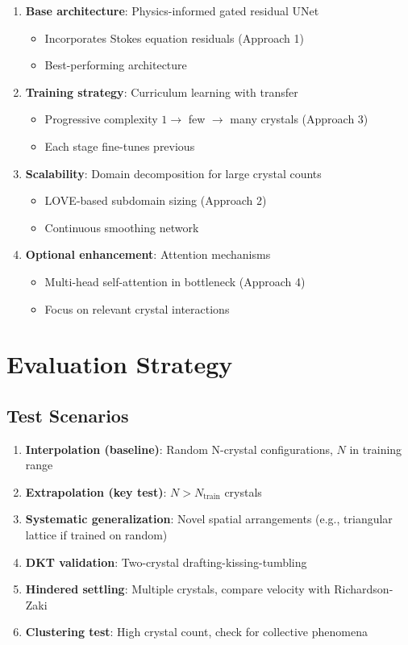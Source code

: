 \begin{enumerate}
    \item \textbf{Base architecture}: Physics-informed gated residual UNet
    \begin{itemize}
        \item Incorporates Stokes equation residuals (Approach 1)
        \item Best-performing architecture \cite{rana2024}
    \end{itemize}
    
    \item \textbf{Training strategy}: Curriculum learning with transfer
    \begin{itemize}
        \item Progressive complexity $1 \rightarrow$ few $\rightarrow$ many crystals (Approach 3)
        \item Each stage fine-tunes previous
    \end{itemize}
    
    \item \textbf{Scalability}: Domain decomposition for large crystal counts
    \begin{itemize}
        \item LOVE-based subdomain sizing (Approach 2)
        \item Continuous smoothing network
    \end{itemize}
    
    \item \textbf{Optional enhancement}: Attention mechanisms
    \begin{itemize}
        \item Multi-head self-attention in bottleneck (Approach 4)
        \item Focus on relevant crystal interactions
    \end{itemize}
\end{enumerate}

\section{Evaluation Strategy}

\subsection{Test Scenarios}
\begin{enumerate}
    \item \textbf{Interpolation (baseline)}: Random N-crystal configurations, $N$ in training range
    \item \textbf{Extrapolation (key test)}: $N > N_{\text{train}}$ crystals
    \item \textbf{Systematic generalization}: Novel spatial arrangements (e.g., triangular lattice if trained on random)
    \item \textbf{DKT validation}: Two-crystal drafting-kissing-tumbling
    \item \textbf{Hindered settling}: Multiple crystals, compare velocity with Richardson-Zaki
    \item \textbf{Clustering test}: High crystal count, check for collective phenomena
\end{enumerate}

